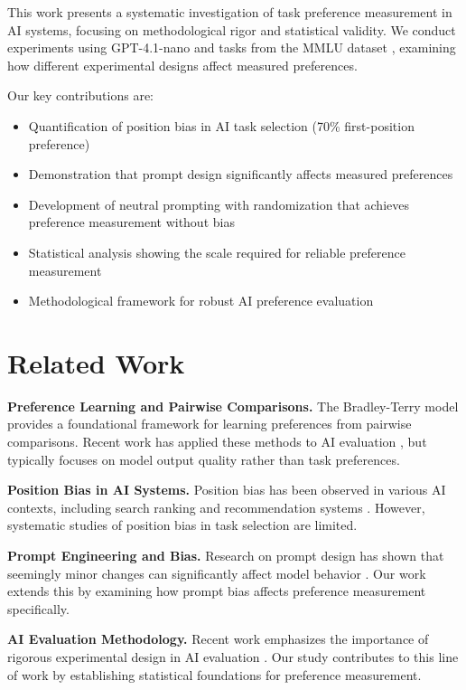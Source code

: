 \documentclass[11pt,a4paper]{article}
\begin{document}
This work presents a systematic investigation of task preference measurement in AI systems, focusing on methodological rigor and statistical validity. We conduct experiments using GPT-4.1-nano and tasks from the MMLU dataset \cite{hendrycks2020measuring}, examining how different experimental designs affect measured preferences.

Our key contributions are:
\begin{itemize}
    \item Quantification of position bias in AI task selection (70\% first-position preference)
    \item Demonstration that prompt design significantly affects measured preferences
    \item Development of neutral prompting with randomization that achieves preference measurement without bias
    \item Statistical analysis showing the scale required for reliable preference measurement
    \item Methodological framework for robust AI preference evaluation
\end{itemize}

\section{Related Work}

\textbf{Preference Learning and Pairwise Comparisons.} The Bradley-Terry model \cite{bradley1952rank} provides a foundational framework for learning preferences from pairwise comparisons. Recent work has applied these methods to AI evaluation \cite{dubois2024alpacafarm, zheng2023judging}, but typically focuses on model output quality rather than task preferences.

\textbf{Position Bias in AI Systems.} Position bias has been observed in various AI contexts, including search ranking \cite{joachims2017accurately} and recommendation systems \cite{wang2018position}. However, systematic studies of position bias in task selection are limited.

\textbf{Prompt Engineering and Bias.} Research on prompt design has shown that seemingly minor changes can significantly affect model behavior \cite{reynolds2021prompt, zhao2021calibrate}. Our work extends this by examining how prompt bias affects preference measurement specifically.

\textbf{AI Evaluation Methodology.} Recent work emphasizes the importance of rigorous experimental design in AI evaluation \cite{gehrmann2021gem, liang2022holistic}. Our study contributes to this line of work by establishing statistical foundations for preference measurement.
\end{document}
